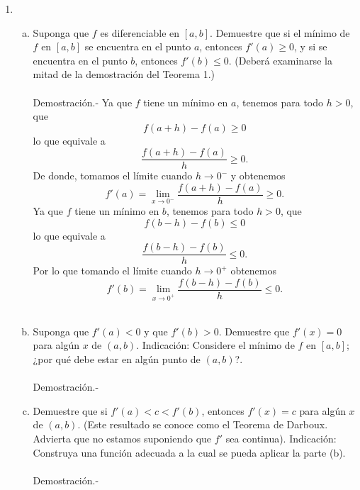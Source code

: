 \begin{enumerate}[\bfseries 1.]
    \item 
	\begin{enumerate}[(a)]

	    \item Suponga que $f$ es diferenciable en $[a,b]$. Demuestre que si el mínimo de $f$ en $[a,b]$ se encuentra en el punto $a$, entonces $f'(a)\geq 0$, y si se encuentra en el punto $b$, entonces $f'(b)\leq 0.$ (Deberá examinarse la mitad de la demostración del Teorema 1.)\\\\
		Demostración.-\; Ya que $f$ tiene un mínimo en $a$, tenemos para todo $h>0$, que
		$$f(a+h)-f(a)\geq 0$$
		lo que equivale a 
		$$\dfrac{f(a+h)-f(a)}{h}\geq 0.$$
		De donde, tomamos el límite cuando $h\to 0^-$ y obtenemos
		$$f'(a)=\lim_{x\to 0^-}\dfrac{f(a+h)-f(a)}{h}\geq 0.$$
		Ya que $f$ tiene un mínimo en $b$, tenemos para todo $h>0$, que
		$$f(b-h)-f(b)\leq 0$$
		lo que equivale a 
		$$\dfrac{f(b-h)-f(b)}{h}\leq 0.$$
		Por lo que tomando el límite cuando $h\to 0^+$ obtenemos
		$$f'(b)=\lim_{x\to 0^+}\dfrac{f(b-h)-f(b)}{h}\leq 0.$$\\

	    \item Suponga que $f'(a)<0$ y que $f'(b)>0.$ Demuestre que $f'(x)=0$ para algún $x$ de $(a,b)$. Indicación: Considere el mínimo de $f$ en $[a,b]$; ¿por qué debe estar en algún punto de $(a,b)$?.\\\\
		Demostración.-\;

	    \item Demuestre que si $f'(a)<c<f'(b)$, entonces $f'(x)=c$ para algún $x$ de $(a,b)$. (Este resultado se conoce como el Teorema de Darboux. Advierta que no estamos suponiendo que $f'$ sea continua). Indicación: Construya una función adecuada a la cual se pueda aplicar la parte (b).\\\\ 
		Demostración.-\;

	\end{enumerate}


	
\end{enumerate}

